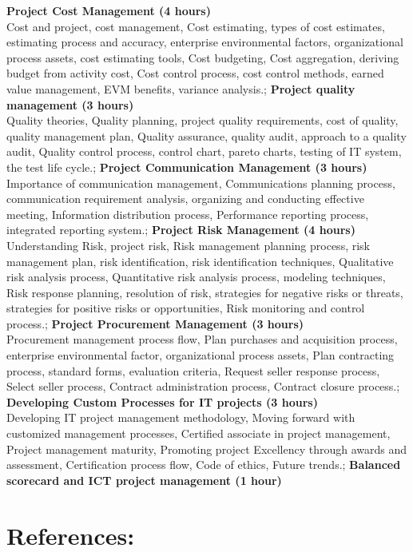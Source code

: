 {    \textbf{Project Cost Management \hfill (4 hours)} \\
    Cost and project, cost management, Cost estimating, types of cost estimates, estimating process and accuracy, enterprise environmental factors, organizational process assets, cost estimating tools, Cost budgeting, Cost aggregation, deriving budget from activity cost, Cost control process, cost control methods, earned value management, EVM benefits, variance analysis.;
    \textbf{Project quality management \hfill (3 hours)} \\
    Quality theories, Quality planning, project quality requirements, cost of quality, quality management plan, Quality assurance, quality audit, approach to a quality audit, Quality control process, control chart, pareto charts, testing of IT system, the test life cycle.;
    \textbf{Project Communication Management \hfill (3 hours)} \\
    Importance of communication management, Communications planning process, communication requirement analysis, organizing and conducting effective meeting, Information distribution process, Performance reporting process, integrated reporting system.;
    \textbf{Project Risk Management \hfill (4 hours)} \\
    Understanding Risk, project risk, Risk management planning process, risk management plan, risk identification, risk identification techniques, Qualitative risk analysis process, Quantitative risk analysis process, modeling techniques, Risk response planning, resolution of risk, strategies for negative risks or threats, strategies for positive risks or opportunities, Risk monitoring and control process.;
    \textbf{Project Procurement Management \hfill (3 hours)} \\
    Procurement management process flow, Plan purchases and acquisition process, enterprise environmental factor, organizational process assets, Plan contracting process, standard forms, evaluation criteria, Request seller response process, Select seller process, Contract administration process, Contract closure process.;
    \textbf{Developing Custom Processes for IT projects \hfill (3 hours)} \\
    Developing IT project management methodology, Moving forward with customized management processes, Certified associate in project management, Project management maturity, Promoting project Excellency through awards and assessment, Certification process flow, Code of ethics, Future trends.;
    \textbf{Balanced scorecard and ICT project management \hfill (1 hour)}
}

\section*{References:}

